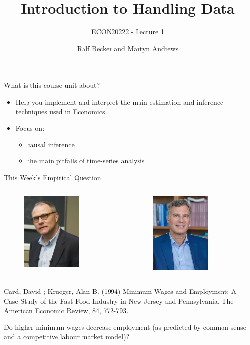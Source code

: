 \documentclass[
  ignorenonframetext,
]{beamer}
\title{Introduction to Handling Data}
\subtitle{ECON20222 - Lecture 1}
\author{Ralf Becker and Martyn Andrews}
\date{}
\begin{document}
\frame{\titlepage}

\begin{frame}{What is this course unit about?}
\protect\hypertarget{what-is-this-course-unit-about}{}
\begin{itemize}
  \item Help you implement and interpret the main estimation and inference techniques used in Economics
  \item Focus on:
      \begin{itemize}
        \item causal inference
        \item the main pitfalls of time-series analysis
      \end{itemize}
\end{itemize}
\end{frame}

\begin{frame}{This Week's Empirical Question}
\protect\hypertarget{this-weeks-empirical-question}{}
\begin{columns}
  
  \begin{column}{0.5\textwidth}
    \begin{figure}
        \centering
        \includegraphics[width=3cm]{david-card.jpg}\\
    \end{figure}

  \end{column}
  \begin{column}{0.5\textwidth}
    \begin{figure}
        \centering
        \includegraphics[width=3cm]{Krueger.jpeg}\\
    \end{figure}

  \end{column}
    
\end{columns}

Card, David ; Krueger, Alan B. (1994) Minimum Wages and Employment: A
Case Study of the Fast-Food Industry in New Jersey and Pennsylvania, The
American Economic Review, 84, 772-793.

Do higher minimum wages decrease employment (as predicted by
common-sense and a competitive labour market model)?
\end{frame}
\end{document}
